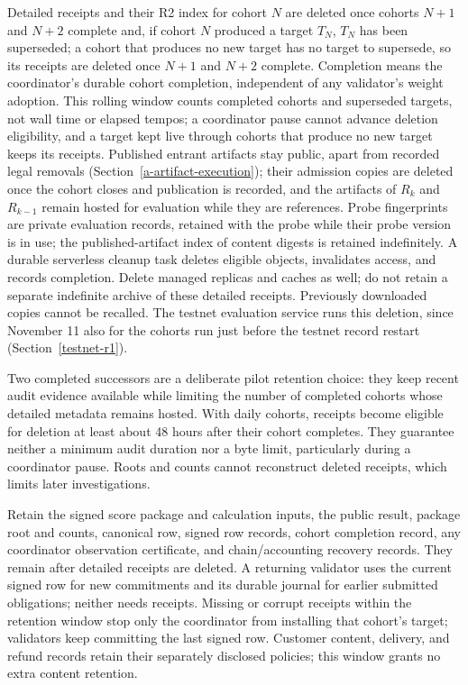 Detailed receipts and their R2 index for cohort \(N\) are deleted once cohorts
\(N+1\) and \(N+2\) complete and, if cohort \(N\) produced a target \(T_N\), \(T_N\)
has been superseded; a cohort that produces no new target has no target to
supersede, so its receipts are deleted once \(N+1\) and \(N+2\) complete.
Completion means the
coordinator's durable cohort completion, independent of any validator's weight
adoption. This rolling window counts completed cohorts and superseded targets,
not wall time or elapsed tempos; a coordinator pause cannot advance deletion
eligibility, and a target kept live through cohorts that produce no new target
keeps its receipts. Published entrant artifacts stay public, apart from
recorded legal removals (Section~\ref{a-artifact-execution}); their admission
copies are deleted once the cohort closes and publication is recorded, and the artifacts of \(R_k\) and \(R_{k-1}\) remain
hosted for evaluation while they are references. Probe fingerprints are private evaluation records, retained
with the probe while their probe version is in use; the published-artifact index
of content digests is retained indefinitely. A durable serverless cleanup task
deletes eligible objects,
invalidates access, and records completion. Delete managed replicas and caches
as well; do not retain a separate indefinite archive of these detailed receipts.
Previously downloaded copies cannot be recalled. The testnet evaluation service
runs this deletion, since November 11 also for the cohorts run just before the
testnet record restart (Section~\ref{testnet-r1}).

Two completed successors are a deliberate pilot retention choice: they keep
recent audit evidence available while limiting the number of completed cohorts
whose detailed metadata remains hosted. With daily cohorts, receipts become
eligible for deletion at least about 48 hours after their cohort completes.
They guarantee neither a minimum audit duration nor a byte limit, particularly
during a coordinator pause. Roots and counts cannot reconstruct deleted
receipts, which limits later investigations.

Retain the signed score package and calculation inputs, the public result,
package root and counts, canonical row, signed row records, cohort completion
record, any coordinator observation certificate, and chain/accounting recovery
records. They remain after detailed receipts are deleted. A returning validator
uses the current signed row for new commitments and its durable journal for
earlier submitted obligations; neither needs receipts. Missing or corrupt
receipts within the retention window stop only the coordinator from installing
that cohort's target; validators keep committing the last signed row. Customer content, delivery, and refund records retain their separately
disclosed policies; this window grants no extra content retention.

